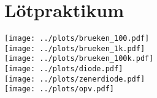 \documentclass[
  11pt,
  a4paper,
  fleqn,
  ngerman,
  parskip,
  toc=bibliography
]{scrartcl}
\begin{document}



\section*{Lötpraktikum}
\label{sec:loetpraktikum}

\texttt{[image: ../plots/brueken\_100.pdf]}\\
\texttt{[image: ../plots/brueken\_1k.pdf]}\\
\texttt{[image: ../plots/brueken\_100k.pdf]}\\
\texttt{[image: ../plots/diode.pdf]}\\
\texttt{[image: ../plots/zenerdiode.pdf]}\\
\texttt{[image: ../plots/opv.pdf]}\\



% 
% 

\end{document}
